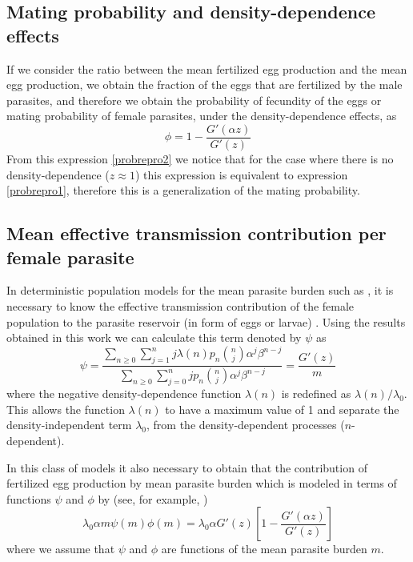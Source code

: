 \documentclass[useAMS,referee,usenatbib]{biom}
\begin{document}
\subsection{Mating probability and density-dependence effects}

If we consider the ratio between the mean fertilized egg production and the mean egg production,  we obtain the fraction of the eggs that are fertilized by the male parasites,
and therefore we obtain the probability of fecundity of the eggs or mating probability of female parasites, under the density-dependence effects, as
\begin{equation}\label{probrepro2}
\phi=1-\frac{G'(\alpha z)}{G'(z)} 
\end{equation}
From this expression \eqref{probrepro2} we notice that for the case where there is no density-dependence ($z \approx 1$) this expression is equivalent to expression \eqref{probrepro1}, therefore this is a generalization of the mating probability.


\subsection{Mean effective transmission contribution per female parasite}
In deterministic population models  for the  mean parasite burden such as \cite{anderson1985helminth,anderson1992infectious,truscott2014modeling}, 
it is necessary to know the effective transmission contribution of the  female population to the parasite reservoir (in form of eggs or larvae)  \cite{churcher2005density,churcher2006density}.
Using the results obtained in this work we can calculate this term denoted by $\psi$ as
\begin{equation}\label{psi}
\psi=\frac{\sum_{n\geq 0}\sum_{j=1}^{n}j\lambda(n)p_n\binom{n}{j}\alpha^j\beta^{n-j}}
{\sum_{n\geq 0}\sum_{j=0}^{n}jp_n\binom{n}{j}\alpha^j\beta^{n-j}}
=\frac{G'(z)}{m}   
\end{equation}
where the negative density-dependence function $\lambda(n)$ is redefined as $\lambda(n)/\lambda_0$.
This allows the function $\lambda(n)$ to have a maximum value of 1
and separate the density-independent term $\lambda_0$, from the density-dependent processes ($n$-dependent).



In this class of models it also necessary to obtain that the contribution of fertilized egg production by mean parasite burden which is modeled  in
terms of functions $\psi$ and $\phi$ by (see, for example,  \cite{anderson1992infectious})
\begin{equation}
\lambda_0\alpha m \psi(m) \phi(m)= \lambda_0 \alpha G'(z) \left[1-\frac{ G'(\alpha z)}{G'(z)}\right] 	
\end{equation}
where we assume that $\psi$ and $\phi$ are functions of the mean parasite burden $m$.  
%	
\end{document}
